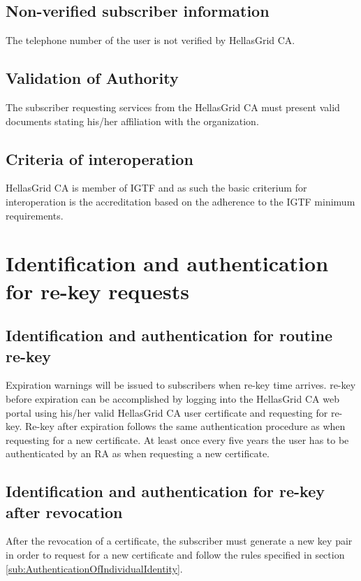 \subsection{Non-verified subscriber information}

The telephone number of the user is not verified by HellasGrid CA.


\subsection{Validation of Authority}
\label{sub:ValidationOfAuthority}

The subscriber requesting services from the HellasGrid CA must present valid documents stating his/her affiliation with the organization.

\subsection{Criteria of interoperation}

HellasGrid CA is member of IGTF and as such the basic criterium for interoperation is the accreditation based on the adherence to the IGTF minimum requirements.

\section{Identification and authentication for re-key requests}
\subsection{Identification and authentication for routine re-key}

Expiration warnings will be issued to subscribers when re-key time arrives. re-key before expiration can be accomplished by logging into the HellasGrid CA web portal using his/her valid HellasGrid CA user certificate and requesting for re-key. Re-key after expiration follows the same authentication procedure as when requesting for a new certificate. At least once every five years the user has to be authenticated by an RA as when requesting a new certificate.

\subsection{Identification and authentication for re-key after revocation}

After the revocation of a certificate, the subscriber must generate a new key pair in order to request for a new certificate and follow the rules specified in section \ref{sub:AuthenticationOfIndividualIdentity}.

